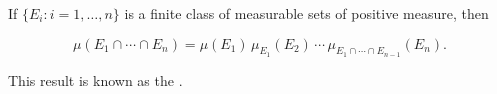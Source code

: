 If $\{E_i : i = 1, \dots, n\}$ is a finite class of measurable sets of positive measure, then

$$\mu(E_1 \cap \cdots \cap E_n) = \mu(E_1) \, \mu_{E_1}(E_2) \, \cdots \, \mu_{E_1 \cap \cdots \cap E_{n-1}}(E_n).$$

This result is known as the .
